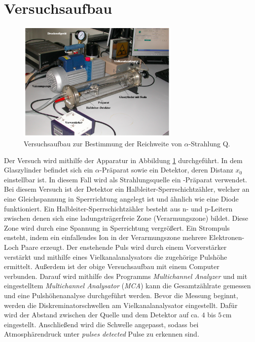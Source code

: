 \section{Versuchsaufbau}
\label{sec:Versuchsaufbau}
\nocite{Halbleiter}
\begin{figure}[H]
  \centering
  \includegraphics[width=0.7\textwidth]{content/Bilder/Messapparatur.png}
  \caption{Versuchsaufbau zur Bestimmung der Reichweite von $\alpha$-Strahlung Q\cite{anleitungV701}.}
  \label{fig:Messapparatur}
\end{figure}
Der Versuch wird mithilfe der Apparatur in Abbildung \ref{fig:Messapparatur} durchgeführt. In dem Glaszylinder 
befindet sich ein $\alpha$-Präparat sowie ein Detektor, deren Distanz $x_0$ einstellbar ist. In diesem Fall wird als 
Strahlungsquelle ein -Präparat verwendet. Bei diesem Versuch ist der Detektor ein Halbleiter-Sperrschichtzähler, welcher an eine 
Gleichspannung in Sperrrichtung angelegt ist und ähnlich wie eine Diode funktioniert. Ein Halbleiter-Sperrschichtzähler besteht aus
n- und p-Leitern zwischen denen sich eine ladungsträgerfreie Zone (Verarmungszone) bildet. Diese Zone wird durch eine Spannung in Sperrichtung vergrößert. 
Ein Strompuls ensteht, indem ein einfallendes Ion in der Verarmungszone mehrere Elektronen-Loch Paare erzeugt. Der enstehende Puls wird durch einem
Vorverstärker verstärkt und mithilfe eines Vielkanalanalysators die zugehörige Pulshöhe ermittelt. Außerdem ist der obige Versuchsaufbau
mit einem Computer verbunden. Darauf wird mithilfe des Programms \textit{Multichannel Analyzer} und mit eingestelltem \textit{Multichannel Analysator} (\textit{MCA})
kann die Gesamtzählrate gemessen und eine Pulshöhenanalyse durchgeführt werden. Bevor die Messung beginnt, werden die Diskreminatorschwellen
am Vielkanalanalysator eingestellt. Dafür wird der Abstand zwischen der Quelle und dem Detektor auf ca. $4$ bis $5\,\unit{\centi\metre}$ eingestellt. 
Anschließend wird die Schwelle angepasst, sodass bei Atmosphärendruck unter \textit{pulses detected} Pulse zu erkennen sind. 


